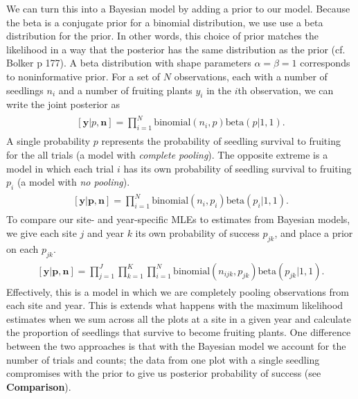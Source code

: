\documentclass[12pt, oneside, titlepage]{article}   	%
\begin{document}
We can turn this into a Bayesian model by adding a prior to our model. Because the beta is a conjugate prior for a binomial distribution, we use use a beta distribution for the prior. In other words, this choice of prior matches the likelihood in a way that the posterior has the same distribution as the prior (cf. Bolker p 177). A beta distribution with shape parameters $\alpha=\beta=1$ corresponds to noninformative prior. For a set of $N$ observations, each with a number of seedlings $n_i$ and a number of fruiting plants $y_i$ in the $i$th observation, we can write the joint posterior as
%
\begin{align}
  \begin{split}
[\bm{y}|p,\bm{n}]  = \prod_{i=1}^N \mathrm{binomial}(n_i,p) \mathrm{beta} (  p | 1 , 1 ).
  \end{split}
\end{align}
%
A single probability $p$ represents the probability of seedling survival to fruiting for the all trials (a model with \textit{complete pooling}). The opposite extreme is a model in which each trial $i$ has its own probability of seedling survival to fruiting $p_i$ (a model with \textit{no pooling}). 
%
\begin{align}
  \begin{split}
[\bm{y}|\bm{p},\bm{n}]  = \prod_{i=1}^N \mathrm{binomial}(n_i,p_i) \mathrm{beta} (  p_i | 1 , 1 ).
  \end{split}
\end{align}
%
To compare our site- and year-specific MLEs to estimates from Bayesian models, we give each site $j$ and year $k$ its own probability of success $p_{jk}$, and place a prior on each $p_{jk}$.
%
\begin{align}
  \begin{split}
[\bm{y}|\bm{p},\bm{n}]  = \prod_{j=1}^J\prod_{k=1}^K\prod_{i=1}^N \mathrm{binomial}(n_{ijk},p_{jk}) \mathrm{beta} (  p_{jk} | 1 , 1 ).
  \end{split}
\end{align}
%
Effectively, this is a model in which we are completely pooling observations from each site and year. This is extends what happens with the maximum likelihood estimates when we sum across all the plots at a site in a given year and calculate the proportion of seedlings that survive to become fruiting plants. One difference between the two approaches is that with the Bayesian model we account for the number of trials and counts; the data from one plot with a single seedling compromises with the prior to give us posterior probability of success (see \textbf{Comparison}).
\end{document}
